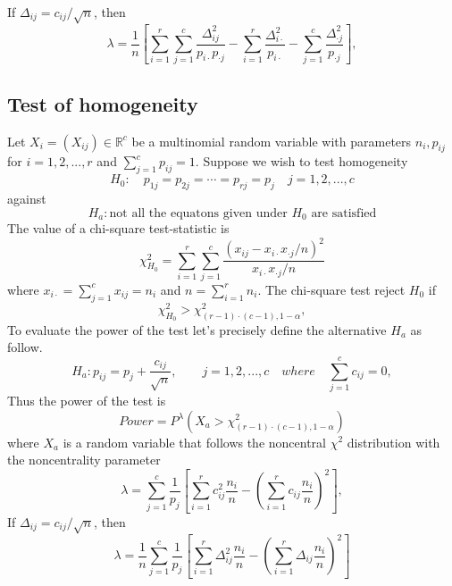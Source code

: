 \documentclass{article}
\begin{document}
If $\Delta_{ij} = c_{ij}/\sqrt{n}$, then 
\begin{equation}
    \lambda = \frac{1}{n}\left[\sum_{i=1}^{r}\sum_{j=1}^c \frac{\Delta_{ij}^2}{p_{i\cdot}p_{\cdot j}} - \sum_{i=1}^{r}\frac{\Delta_{i \cdot}^2}{p_{i \cdot}} - \sum_{j=1}^{c}\frac{\Delta_{\cdot j}^2}{p_{\cdot j}}\right],
\end{equation}



\subsection{Test of homogeneity}
Let $X_i=(X_{ij}) \in \mathbb{R}^{c}$ be a multinomial random variable with
parameters $n_{i},p_{ij}$ for $i=1,2,...,r$ and $\sum_{j=1}^cp_{ij}=1$. 
Suppose we wish to test homogeneity
\begin{equation}
    H_0: \quad p_{1j}=p_{2j}=\cdots = p_{rj} = p_{j}\quad j=1,2,...,c
\end{equation}
against
\begin{equation}
    H_a: \mbox{not all the equatons given under $H_0$ are satisfied}
\end{equation}
The value of a chi-square test-statistic is
\begin{equation}
    \chi^2_{H_0} = \sum_{i=1}^r\sum_{j=1}^c \frac{\left(x_{ij} - x_{i \cdot}x_{\cdot j}/n\right)^2}{x_{i \cdot}x_{\cdot j}/n}
\end{equation}
where $x_{i \cdot} = \sum_{j=1}^c x_{ij} = n_{i}$ and $n = \sum_{i=1}^r n_{i}$.
The chi-square test reject $H_0$ if
\begin{equation}
    \chi^2_{H_0} > \chi^2_{(r-1)\cdot(c-1),1-\alpha},
\end{equation}
To evaluate the power of the test let's precisely define the alternative $H_a$ as follow.
\begin{equation}
    H_a: p_{ij} = p_{j} + \frac{c_{ij}}{\sqrt{n}}, \qquad j=1,2,...,c \quad where \quad \sum_{j=1}^{c}c_{ij}=0, 
\end{equation}
Thus the power of the test is
\begin{equation}
    Power = P^{\lambda}\left(X_a > \chi^2_{(r-1)\cdot(c-1),1-\alpha}\right)
\end{equation}
where $X_a$ is a random variable that follows the noncentral $\chi^2$ distribution with the noncentrality parameter
\begin{equation}
    \lambda = \sum_{j=1}^{c}\frac{1}{p_j}\left[ \sum_{i=1}^{r} c_{ij}^2 \frac{n_i}{n} -  \left(\sum_{i=1}^{r} c_{ij} \frac{n_i}{n}\right)^2  \right],
\end{equation}
If $\Delta_{ij} = c_{ij}/\sqrt{n}$, then 
\begin{equation}
    \lambda = \frac{1}{n}\sum_{j=1}^{c}\frac{1}{p_j}\left[ \sum_{i=1}^{r} \Delta_{ij}^2 \frac{n_i}{n} -  \left(\sum_{i=1}^{r} \Delta_{ij} \frac{n_i}{n}\right)^2  \right]
\end{equation}
\end{document}
